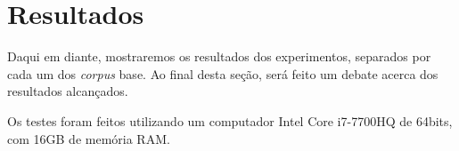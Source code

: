 \section{Resultados}
\label{resultados}
Daqui em diante, mostraremos os resultados dos experimentos, separados por cada um dos \textit{corpus} base. Ao final desta seção, será feito um debate acerca dos resultados alcançados.

Os testes foram feitos utilizando um computador Intel Core i7-7700HQ de 64bits, com 16GB de memória RAM.


